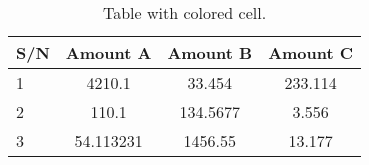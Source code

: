\documentclass{article}
\begin{document}
\begin{table}[h!]
  \begin{center}
 	\caption{Table with colored cell.}
 	\label{tab:table1}
 	\begin{tabular}{|l|S|S|c|}
 		\hline 
 		\textbf{S/N} & \textbf{Amount A} & \textbf{Amount B} & \textbf{Amount C}\\
 		\hline
 		1 & 4210.1 & 33.454 & 233.114\\
 		2 & 110.1 & 134.5677 & 3.556\\
 		3 & 54.113231 & 1456.55 & 13.177\\
 		\hline
 	\end{tabular}
   \end{center}
\end{table}
\end{document}
